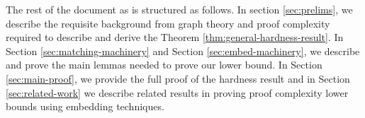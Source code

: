 \documentclass[11pt]{article}
\begin{document}
The rest of the document as is structured as follows. In section \ref{sec:prelims}, we describe the requisite background from graph theory and proof complexity required to describe and derive the Theorem \ref{thm:general-hardness-result}.
In Section \ref{sec:matching-machinery} and Section \ref{sec:embed-machinery}, we describe and prove the main lemmas needed to prove our lower bound.
In Section \ref{sec:main-proof}, we provide the full proof of the hardness result and in Section \ref{sec:related-work} we describe related results in proving proof complexity lower bounds using embedding techniques.
\end{document}
